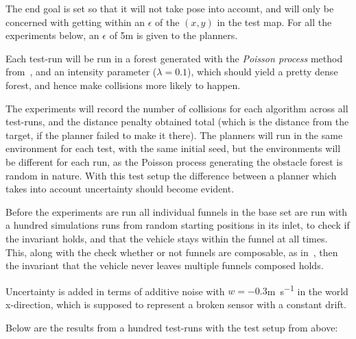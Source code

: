 The end goal is set so that it will not take pose into account, and will only be
concerned with getting within an \(\epsilon\) of the \((x,y)\) in the test map.
For all the experiments below, an \(\epsilon\) of 5\si{\metre} is given to the
planners.

Each test-run will be run in a forest generated with the \textit{Poisson
  process} method from~, and an intensity parameter
(\(\lambda = 0.1\)), which should yield a pretty dense forest, and hence make
collisions more likely to happen.

The experiments will record the number of collisions for each algorithm across
all test-runs, and the distance penalty obtained total (which is the distance
from the target, if the planner failed to make it there). The planners will run
in the same environment for each test, with the same initial seed, but the
environments will be different for each run, as the Poisson process generating
the obstacle forest is random in nature. With this test setup the difference
between a planner which takes into account uncertainty should become evident.

Before the experiments are run all individual funnels in the base set are run
with a hundred simulations runs from random starting positions in its inlet, to
check if the invariant holds, and that the vehicle stays within the funnel at
all times. This, along with the check whether or not funnels are composable, as
in~, then the invariant that the vehicle never
leaves multiple funnels composed holds.

Uncertainty is added in terms of additive noise with \(w = -0.3\)\si{m.s^{-1}}
in the world x-direction, which is supposed to represent a broken sensor with a
constant drift.

Below are the results from a hundred test-runs with the test setup from above:


